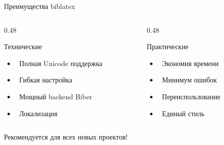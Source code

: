 \documentclass[aspectratio=169, 12pt]{beamer}
\begin{document}
\begin{frame}{Преимущества biblatex}
  \begin{columns}[c]
    \begin{column}{0.48\textwidth}
      \begin{block}{Технические}
        \begin{itemize}
          \item \faCode\ Полная Unicode поддержка
          \item \faCogs\ Гибкая настройка
          \item \faDatabase\ Мощный backend Biber
          \item \faLanguage\ Локализация
        \end{itemize}
      \end{block}
    \end{column}
    
    \begin{column}{0.48\textwidth}
      \begin{block}{Практические}
        \begin{itemize}
          \item \faClock\ Экономия времени
          \item \faCheckDouble\ Минимум ошибок
          \item \faSync\ Переиспользование
          \item \faPalette\ Единый стиль
        \end{itemize}
      \end{block}
    \end{column}
  \end{columns}
  
  \vspace{1cm}
  
  \begin{center}
    \Large
    \textcolor{mygreen}{\faThumbsUp} Рекомендуется для всех новых проектов!
  \end{center}
\end{frame}
\end{document}
